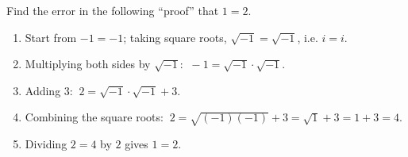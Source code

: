 Find the error in the following ``proof'' that $1=2$.
\begin{enumerate}
\item Start from $-1=-1$; taking square roots, $\sqrt{-1}=\sqrt{-1}$, i.e. $i=i$.
\item Multiplying both sides by $\sqrt{-1}$: $\ -1=\sqrt{-1}\cdot\sqrt{-1}$.
\item Adding $3$: $\ 2=\sqrt{-1}\cdot\sqrt{-1}+3$.
\item Combining the square roots: $\ 2=\sqrt{(-1)(-1)}+3=\sqrt1+3=1+3=4$.
\item Dividing $2=4$ by $2$ gives $1=2$.
\end{enumerate}
